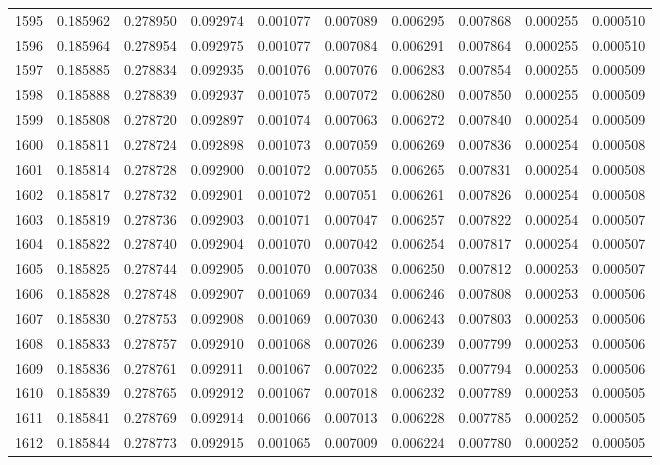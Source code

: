 \begin{tabular}{lrrrrrrrrr}
1595 & 0.185962 & 0.278950 & 0.092974 & 0.001077 & 0.007089 & 0.006295 & 0.007868 & 0.000255 & 0.000510 \\
1596 & 0.185964 & 0.278954 & 0.092975 & 0.001077 & 0.007084 & 0.006291 & 0.007864 & 0.000255 & 0.000510 \\
1597 & 0.185885 & 0.278834 & 0.092935 & 0.001076 & 0.007076 & 0.006283 & 0.007854 & 0.000255 & 0.000509 \\
1598 & 0.185888 & 0.278839 & 0.092937 & 0.001075 & 0.007072 & 0.006280 & 0.007850 & 0.000255 & 0.000509 \\
1599 & 0.185808 & 0.278720 & 0.092897 & 0.001074 & 0.007063 & 0.006272 & 0.007840 & 0.000254 & 0.000509 \\
1600 & 0.185811 & 0.278724 & 0.092898 & 0.001073 & 0.007059 & 0.006269 & 0.007836 & 0.000254 & 0.000508 \\
1601 & 0.185814 & 0.278728 & 0.092900 & 0.001072 & 0.007055 & 0.006265 & 0.007831 & 0.000254 & 0.000508 \\
1602 & 0.185817 & 0.278732 & 0.092901 & 0.001072 & 0.007051 & 0.006261 & 0.007826 & 0.000254 & 0.000508 \\
1603 & 0.185819 & 0.278736 & 0.092903 & 0.001071 & 0.007047 & 0.006257 & 0.007822 & 0.000254 & 0.000507 \\
1604 & 0.185822 & 0.278740 & 0.092904 & 0.001070 & 0.007042 & 0.006254 & 0.007817 & 0.000254 & 0.000507 \\
1605 & 0.185825 & 0.278744 & 0.092905 & 0.001070 & 0.007038 & 0.006250 & 0.007812 & 0.000253 & 0.000507 \\
1606 & 0.185828 & 0.278748 & 0.092907 & 0.001069 & 0.007034 & 0.006246 & 0.007808 & 0.000253 & 0.000506 \\
1607 & 0.185830 & 0.278753 & 0.092908 & 0.001069 & 0.007030 & 0.006243 & 0.007803 & 0.000253 & 0.000506 \\
1608 & 0.185833 & 0.278757 & 0.092910 & 0.001068 & 0.007026 & 0.006239 & 0.007799 & 0.000253 & 0.000506 \\
1609 & 0.185836 & 0.278761 & 0.092911 & 0.001067 & 0.007022 & 0.006235 & 0.007794 & 0.000253 & 0.000506 \\
1610 & 0.185839 & 0.278765 & 0.092912 & 0.001067 & 0.007018 & 0.006232 & 0.007789 & 0.000253 & 0.000505 \\
1611 & 0.185841 & 0.278769 & 0.092914 & 0.001066 & 0.007013 & 0.006228 & 0.007785 & 0.000252 & 0.000505 \\
1612 & 0.185844 & 0.278773 & 0.092915 & 0.001065 & 0.007009 & 0.006224 & 0.007780 & 0.000252 & 0.000505 \\

\end{tabular}

